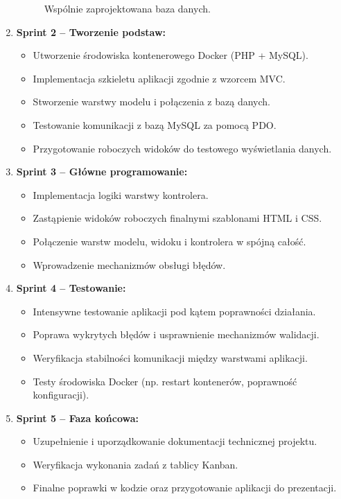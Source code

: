 \documentclass[12pt,a4paper]{article}
\begin{document}
\begin{enumerate}
\begin{figure}[h!]
		\caption{Wspólnie zaprojektowana baza danych.}
		\label{fig:bazadanych}
	\end{figure}
	\item \textbf{Sprint 2 -- Tworzenie podstaw:}
	\begin{itemize}
		\item Utworzenie środowiska kontenerowego Docker (PHP + MySQL).
		\item Implementacja szkieletu aplikacji zgodnie z wzorcem MVC.
		\item Stworzenie warstwy modelu i połączenia z bazą danych.
		\item Testowanie komunikacji z bazą MySQL za pomocą PDO.
		\item Przygotowanie roboczych widoków do testowego wyświetlania danych.
	\end{itemize}
	\item \textbf{Sprint 3 -- Główne programowanie:}
	\begin{itemize}
		\item Implementacja logiki warstwy kontrolera.
		\item Zastąpienie widoków roboczych finalnymi szablonami HTML i CSS.
		\item Połączenie warstw modelu, widoku i kontrolera w spójną całość.
		\item Wprowadzenie mechanizmów obsługi błędów.
	\end{itemize}
	\newpage
	\item \textbf{Sprint 4 -- Testowanie:}
	\begin{itemize}
		\item Intensywne testowanie aplikacji pod kątem poprawności działania.
		\item Poprawa wykrytych błędów i usprawnienie mechanizmów walidacji.
		\item Weryfikacja stabilności komunikacji między warstwami aplikacji.
		\item Testy środowiska Docker (np. restart kontenerów, poprawność konfiguracji).
	\end{itemize}
	\item \textbf{Sprint 5 -- Faza końcowa:}
	\begin{itemize}
		\item Uzupełnienie i uporządkowanie dokumentacji technicznej projektu.
		\item Weryfikacja wykonania zadań z tablicy Kanban.
		\item Finalne poprawki w kodzie oraz przygotowanie aplikacji do prezentacji.
	\end{itemize}
\end{enumerate}
\end{document}
